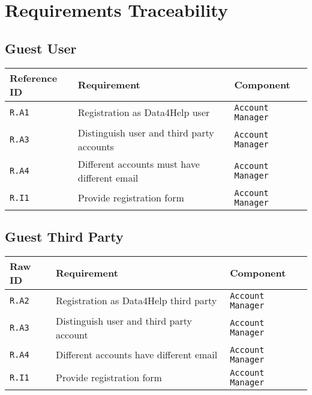 \documentclass[../DD0.tex]{subfiles}
\begin{document}
\section{Requirements Traceability}
\label{sec:req}

\subsection{Guest User}

    \begin{table}[h!]

      \centering
      \begin{tabularx}{.8\linewidth}{|X|X|X|}
        \hline
        \textbf{Reference ID} & \textbf{Requirement} & \textbf{Component} \\ \hline
        \texttt{R.A1} & Registration as Data4Help user &\texttt{Account Manager} \\
        \hline
        \texttt{R.A3} & Distinguish user and third party accounts & \texttt{Account Manager} \\
        \hline
        \texttt{R.A4} & Different accounts must have different email & \texttt{Account Manager} \\
        \hline
        \texttt{R.I1} & Provide registration form  & \texttt{Account Manager} \\
        \hline
      \end{tabularx}
      \label{tab:guestuser}

    \end{table}


\subsection{Guest Third Party}

    \begin{table}[h!]

      \centering
      \begin{tabularx}{.8\linewidth}{|X|X|X|}
        \hline
        \textbf{Raw ID} & \textbf{Requirement} & \textbf{Component} \\ \hline
        \texttt{R.A2} & Registration as Data4Help third party &\texttt{Account Manager} \\
        \hline
        \texttt{R.A3} & Distinguish user and third party account & \texttt{Account Manager} \\
        \hline
        \texttt{R.A4} & Different accounts have different email & \texttt{Account Manager} \\
        \hline
        \texttt{R.I1} & Provide registration form & \texttt{Account Manager} \\
        \hline
       
      \end{tabularx}
      \label{tab:guesttp}

    \end{table}
\end{document}
